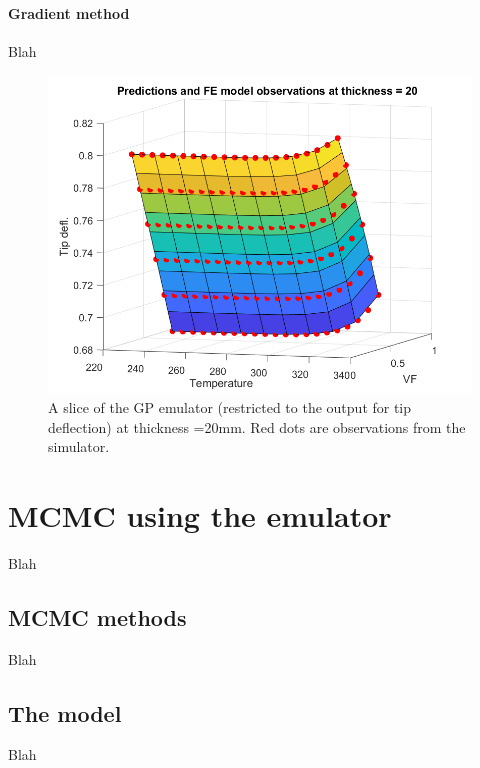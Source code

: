 \documentclass{article}
\begin{document}
\paragraph{Gradient method}
Blah

\begin{figure}
\centering
\includegraphics[width=.65\linewidth]{emulator_surface}
\caption{A slice of the GP emulator (restricted to the output for tip deflection) at thickness =20mm. Red dots are observations from the simulator.}
\label{fig:emulator_surface}
\end{figure}

\section{MCMC using the emulator}
Blah

\subsection{MCMC methods}
Blah

\subsection{The model}
Blah
\end{document}
